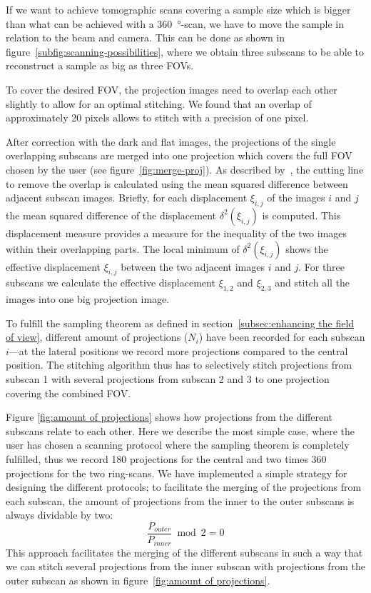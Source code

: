If we want to achieve tomographic scans covering a sample size which is bigger than what can be achieved with a \SI{360}{\degree}-scan, we have to move the sample in relation to the beam and camera. This can be done as shown in figure~\ref{subfig:scanning-possibilities}, where we obtain three subscans to be able to reconstruct a sample as big as three FOVs.

To cover the desired FOV, the projection images need to overlap each other slightly to allow for an optimal stitching. We found that an overlap of approximately 20 pixels allows to stitch with a precision of one pixel.

After correction with the dark and flat images, the projections of the single overlapping subscans are merged into one projection which covers the full FOV chosen by the user (see figure~\ref{fig:merge-proj}). As described by~\citet{Hintermueller2009}, the cutting line to remove the overlap is calculated using the mean squared difference between adjacent subscan images. Briefly, for each displacement $\xi_{i,j}$ of the images $i$ and $j$ the mean squared difference of the displacement $\delta^2(\xi_{i,j})$ is computed. This displacement measure provides a measure for the inequality of the two images within their overlapping parts. The local minimum of $\delta^2(\xi_{i,j})$ shows the effective displacement $\xi_{i,j}$ between the two adjacent images $i$ and $j$. For three subscans we calculate the effective displacement $\xi_{1,2}$ and $\xi_{2,3}$ and stitch all the images into one big projection image.

To fulfill the sampling theorem as defined in section~\ref{subsec:enhancing the field of view}, different amount of projections ($N_{i}$) have been recorded for each subscan $i$---at the lateral positions we record more projections compared to the central position. The stitching algorithm thus has to selectively stitch projections from subscan 1 with several projections from subscan 2 and 3 to one projection covering the combined FOV.

Figure \ref{fig:amount of projections} shows how projections from the different subscans relate to each other. Here we describe the most simple case, where the user has chosen a scanning protocol where the sampling theorem is completely fulfilled, thus we record 180 projections for the central and two times 360 projections for the two ring-scans. We have implemented a simple strategy for designing the different protocols; to facilitate the merging of the projections from each subscan, the amount of projections from the inner to the outer subscans is always dividable by two: 
\begin{equation}
	\frac{P_{outer}}{P_{inner}} \bmod 2 = 0
\label{eq:Modulo}
\end{equation}
This approach facilitates the merging of the different subscans in such a way that we can stitch several projections from the inner subscan with projections from the outer subscan as shown in figure~\ref{fig:amount of projections}.

